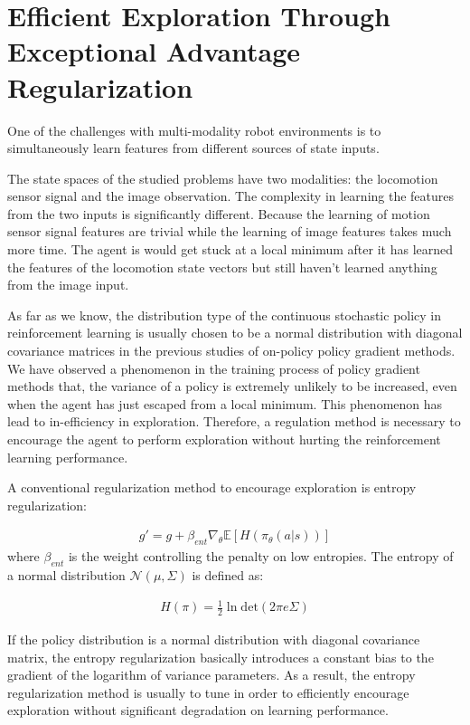 \section{Efficient Exploration Through Exceptional Advantage Regularization}\label{sec_method_expadv_reg}
One of the challenges with multi-modality robot environments is to simultaneously learn features from different sources of state inputs.

The state spaces of the studied problems have two modalities: the locomotion sensor signal and the image observation. The complexity in learning the features from the two inputs is significantly different. Because the learning of motion sensor signal features are trivial while the learning of image features takes much more time. The agent is would get stuck at a local minimum after it has learned the features of the locomotion state vectors but still haven't learned anything from the image input.

As far as we know, the distribution type of the continuous stochastic policy in reinforcement learning is usually chosen to be a normal distribution with diagonal covariance matrices in the previous studies of on-policy policy gradient methods. We have observed a phenomenon in the training process of policy gradient methods that, the variance of a policy is extremely unlikely to be increased, even when the agent has just escaped from a local minimum. This phenomenon has lead to in-efficiency in exploration. Therefore, a regulation method is necessary to encourage the agent to perform exploration without hurting the reinforcement learning performance.

A conventional regularization method to encourage exploration is entropy regularization:

\begin{align}
g' = g +\beta_{ent}\nabla_\theta \mathbb{E}[ H(\pi_\theta(a|s)) ]
\end{align}
where $\beta_{ent}$ is the weight controlling the penalty on low entropies.
The entropy of a normal distribution $\mathcal{N}(\mu,\Sigma)$ is defined as:

\begin{align}
	H(\pi) =  \frac{1}{2} \ln \mathrm{det}(2\pi e \Sigma)
\end{align}

If the policy distribution is a normal distribution with diagonal covariance matrix, the entropy regularization basically introduces a constant bias to the gradient of the logarithm of variance parameters. As a result, the entropy regularization method is usually to tune in order to efficiently encourage exploration without significant degradation on learning performance.

